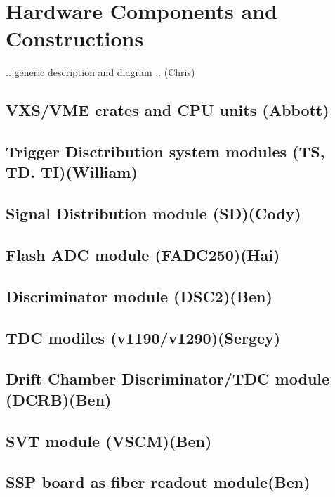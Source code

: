 \section{Hardware Components and Constructions}

.. generic description and diagram .. (Chris)

\subsection{VXS/VME crates and CPU units (Abbott)}

\subsection{Trigger Disctribution system modules (TS, TD. TI)(William)}
	
\subsection{Signal Distribution module (SD)(Cody)}

\subsection{Flash ADC module (FADC250)(Hai)}

\subsection{Discriminator module (DSC2)(Ben)}

\subsection{TDC modiles (v1190/v1290)(Sergey)}

\subsection{Drift Chamber Discriminator/TDC module (DCRB)(Ben)}

\subsection{SVT module (VSCM)(Ben)}

\subsection{SSP board as fiber readout module(Ben)}
